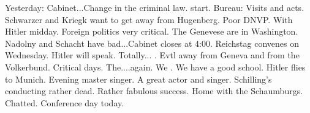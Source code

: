 Yesterday: Cabinet...Change in the criminal law. start. Bureau: Visits and acts. Schwarzer and Kriegk want to get away from Hugenberg. Poor DNVP. With Hitler midday. Foreign politics very critical. The Genevese are in Washington. Nadolny and Schacht have bad...Cabinet closes at 4:00. Reichstag convenes on Wednesday. Hitler will speak. Totally... . Evtl away from Geneva and from the Volkerbund. Critical days. The....again. We . We have a good school. Hitler flies to Munich. Evening master singer. A great actor and singer. Schilling's conducting rather dead. Rather fabulous success. Home with the Schaumburgs. Chatted. Conference day today.